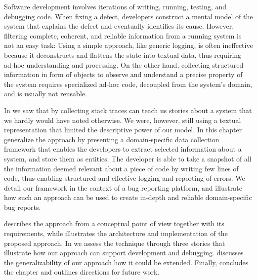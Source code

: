 



Software development involves iterations of writing, running, testing, and debugging code.
When fixing a defect, developers construct a mental model of the system that explains the defect and eventually identifies its cause.
However, filtering complete, coherent, and reliable information from a running system is not an easy task: Using a simple approach, like generic logging, is often ineffective because it deconstructs and flattens the state into textual data, thus requiring ad-hoc understanding and processing.
On the other hand, collecting structured information in form of objects to observe and understand a precise property of the system requires specialized ad-hoc code, decoupled from the system's domain, and is usually not reusable.

In  we saw that by collecting stack traces can teach us stories about a system that we hardly would have noted otherwise.
We were, however, still using a textual representation that limited the descriptive power of our model.
In this chapter generalize the approach by presenting a domain-specific data collection framework that enables the developers to extract selected information about a system, and store them as entities.
The developer is able to take a snapshot of all the information deemed relevant about a piece of code by writing few lines of code, thus enabling structured and effective logging and reporting of errors.
We detail our framework in the context of a bug reporting platform, and illustrate how such an approach can be used to create in-depth and reliable domain-specific bug reports.

\structure

 describes the approach from a conceptual point of view together with its requirements, while  illustrates the architecture and implementation of the proposed approach.
In  we assess the technique through three stories that illustrate how our approach can support development and debugging.
 discusses the generalizability of our approach how it could be extended.
Finally,  concludes the chapter and outlines directions for future work.

